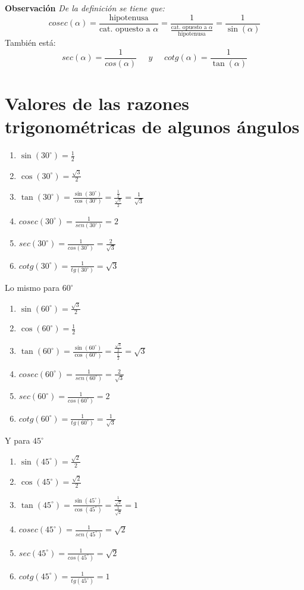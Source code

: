 \textbf{Observación} \emph{De la definición se tiene que:}
$$cosec(\alpha) = \frac{\text{hipotenusa}}{\text{cat. opuesto a } \alpha} = \frac{1}{\frac{{\text{cat. opuesto a } \alpha}}{\text{hipotenusa}}} = \frac{1}{\sin (\alpha)}$$
También está:
$$sec(\alpha) = \frac{1}{cos(\alpha)} \;\;\;\;\; y \;\;\;\;\; cotg(\alpha) = \frac{1}{\tan(\alpha)}$$

\section{Valores de las razones trigonométricas de algunos ángulos}

\begin{enumerate}
    \item $\sin(30^\circ) = \frac{1}{2}$
    \item $\cos(30^\circ) = \frac{\sqrt{3}}{2}$
    \item $\tan(30^\circ) = \frac{\sin(30^\circ)}{\cos(30^\circ)} = \frac{\frac{1}{2}}{\frac{\sqrt{3}}{2}} = \frac{1}{\sqrt{3}}$
    \item $cosec(30^\circ) = \frac{1}{sen(30^\circ)} = 2$
    \item $sec(30^\circ) = \frac{1}{cos(30^\circ)} = \frac{2}{\sqrt{3}}$
    \item $cotg(30^\circ) = \frac{1}{tg(30^\circ)} = \sqrt{3}$
\end{enumerate}
Lo mismo para $60^\circ$
\begin{enumerate}
    \item $\sin(60^\circ) = \frac{\sqrt{3}}{2}$
    \item $\cos(60^\circ) = \frac{1}{2}$
    \item $\tan(60^\circ) = \frac{\sin(60^\circ)}{\cos(60^\circ)} = \frac{\frac{\sqrt{3}}{2}}{\frac{1}{2}} = \sqrt{3}$
    \item $cosec(60^\circ) = \frac{1}{sen(60^\circ)} = \frac{2}{\sqrt{3}}$
    \item $sec(60^\circ) = \frac{1}{cos(60^\circ)} = 2$
    \item $cotg(60^\circ) = \frac{1}{tg(60^\circ)} = \frac{1}{\sqrt{3}}$
\end{enumerate}
Y para $45^\circ$
\begin{enumerate}
    \item $\sin(45^\circ) = \frac{\sqrt{2}}{2}$
    \item $\cos(45^\circ) = \frac{\sqrt{2}}{2}$
    \item $\tan(45^\circ) = \frac{\sin(45^\circ)}{\cos(45^\circ)} = \frac{\frac{1}{\sqrt{2}}}{\frac{1}{\sqrt{2}}} = 1$
    \item $cosec(45^\circ) = \frac{1}{sen(45^\circ)} = \sqrt{2}$
    \item $sec(45^\circ) = \frac{1}{cos(45^\circ)} = \sqrt{2}$
    \item $cotg(45^\circ) = \frac{1}{tg(45^\circ)} = 1$
\end{enumerate}

